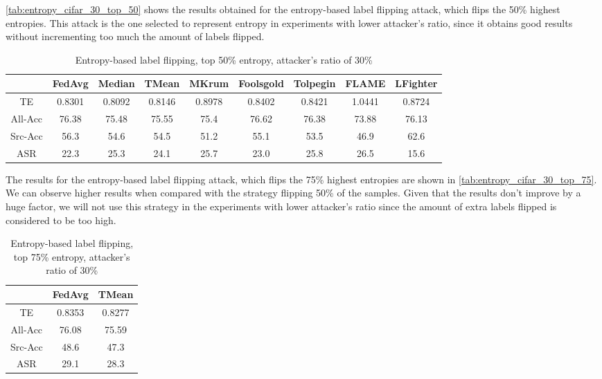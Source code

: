 \autoref{tab:entropy_cifar_30_top_50} shows the results obtained for the entropy-based label flipping attack, which flips the 50\% highest entropies.
This attack is the one selected to represent entropy in experiments with lower attacker's ratio, since it obtains good results without incrementing too much the amount of labels flipped.

\begin{table}[h!]
        \centering
        \small
        \begin{adjustbox}{center}
        \begin{tabular}{|c|c|c|c|c|c|c|c|c|}
            \hline
            & FedAvg & Median & TMean & MKrum & Foolsgold & Tolpegin & FLAME & LFighter \\
            \hline
            TE & 0.8301 & 0.8092 & 0.8146 & 0.8978 & 0.8402 & 0.8421 & 1.0441 & 0.8724 \\
            \hline
            All-Acc & 76.38 & 75.48 & 75.55 & 75.4 & 76.62 & 76.38 & 73.88 & 76.13 \\
            \hline
            Src-Acc & 56.3 & 54.6 & 54.5 & 51.2 & 55.1 & 53.5 & 46.9 & 62.6 \\
            \hline
            ASR & 22.3 & 25.3 & 24.1 & 25.7 & 23.0 & 25.8 & 26.5 & 15.6 \\
            \hline
        \end{tabular}
        \end{adjustbox}
        \caption{Entropy-based label flipping, top 50\% entropy, attacker's ratio of 30\%}
        \label{tab:entropy_cifar_30_top_50}
    \end{table}
    

The results for the entropy-based label flipping attack, which flips the 75\% highest entropies are shown in \autoref{tab:entropy_cifar_30_top_75}. We can observe higher results when compared with the strategy flipping 50\% of the samples. Given that the results don't improve by a huge factor, we will not use this strategy in the experiments with lower attacker's ratio since the amount of extra labels flipped is considered to be too high.

\begin{table}[h!]
        \centering
        \small
        \begin{adjustbox}{center}
        \begin{tabular}{|c|c|c|}
            \hline
            & FedAvg & TMean \\
            \hline
            TE & 0.8353 & 0.8277 \\
            \hline
            All-Acc & 76.08 & 75.59 \\
            \hline
            Src-Acc & 48.6 & 47.3 \\
            \hline
            ASR & 29.1 & 28.3 \\
            \hline
        \end{tabular}
        \end{adjustbox}
        \caption{Entropy-based label flipping, top 75\% entropy, attacker's ratio of 30\%}
        \label{tab:entropy_cifar_30_top_75}
    \end{table}

